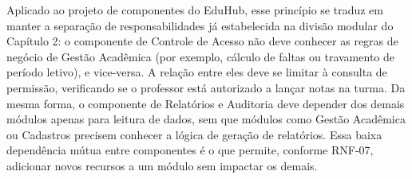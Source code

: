 Aplicado ao projeto de componentes do EduHub, esse princípio se traduz em
manter a separação de responsabilidades já estabelecida na divisão modular
do Capítulo 2: o componente de Controle de Acesso não deve conhecer as
regras de negócio de Gestão Acadêmica (por exemplo, cálculo de faltas ou
travamento de período letivo), e vice-versa. A relação entre eles deve se
limitar à consulta de permissão, verificando se o professor está autorizado a
lançar notas na turma. Da mesma forma, o componente de Relatórios e Auditoria
deve depender dos demais módulos apenas para leitura de dados, sem que módulos
como Gestão Acadêmica ou Cadastros precisem conhecer a lógica de geração de
relatórios. Essa baixa dependência mútua entre componentes é o que permite,
conforme RNF-07, adicionar novos recursos a um módulo sem impactar os
demais.

